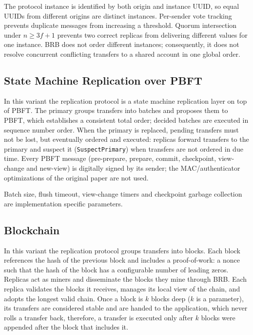 \documentclass[sigconf,a4paper]{acmart}
\newcommand{\api}[1]{\texttt{#1}}
\begin{document}
    The protocol instance is identified by both origin and instance UUID, so
    equal UUIDs from different origins are distinct instances. Per-sender vote
    tracking prevents duplicate messages from increasing a threshold. Quorum
    intersection under $n\geq3f+1$ prevents two correct replicas from delivering
    different values for one instance. BRB does not order different instances;
    consequently, it does not resolve concurrent conflicting transfers to a
    shared account in one global order.

    \subsection{State Machine Replication over PBFT}

    In this variant the replication protocol is a state machine replication layer
    on top of PBFT. The primary groups transfers into batches and proposes them to
    PBFT, which establishes a consistent total order; decided batches are executed
    in sequence number order. When the primary is replaced, pending transfers must
    not be lost, but eventually ordered and executed: replicas forward transfers
    to the primary and suspect it (\api{SuspectPrimary}) when transfers are not
    ordered in due time. Every PBFT message (pre-prepare, prepare, commit,
    checkpoint, view-change and new-view) is digitally signed by its sender; the
    MAC/authenticator optimizations of the original paper are not used.

    Batch size, flush timeout, view-change timers and checkpoint garbage
    collection are implementation specific parameters.

    \subsection{Blockchain}

    In this variant the replication protocol groups transfers into blocks. Each
    block references the hash of the previous block and includes a proof-of-work: a
    nonce such that the hash of the block has a configurable number of leading
    zeros. Replicas act as miners and disseminate the blocks they mine through BRB.
    Each replica validates the blocks it receives, manages its local view of the
    chain, and adopts the longest valid chain. Once a block is $k$ blocks deep
    ($k$ is a parameter), its transfers are considered stable and are handed to the
    application, which never rolls a transfer back, therefore, a transfer is executed
    only after $k$ blocks were appended after the block that includes it.
\end{document}
